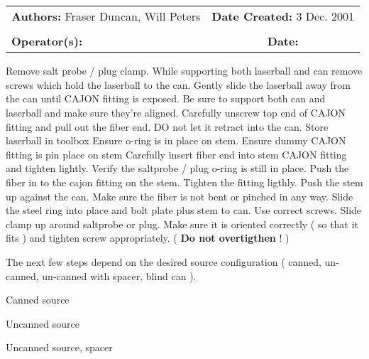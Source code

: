 \documentclass{article}
\begin{document}
 \\   
 \\
\vspace{7mm}
\begin{tabular}{lc}                                                
\textbf{Authors:}  Fraser Duncan, Will Peters    &    \textbf{Date Created:}  3 Dec. 2001   \\ 
                              &                                \\ 
\textbf{Operator(s):}       &           \textbf{Date:} \\
\end{tabular}

   \begin{enumerate}
      
\checkitem Remove salt probe / plug clamp. 
\checkitem While supporting both laserball and can remove screws which hold the laserball to the can.
\checkitem Gently slide the laserball away from the can until CAJON fitting is exposed. Be sure to support both
can and laserball and make sure they're aligned. 
\checkitem Carefully unscrew top end of CAJON fitting and pull out the fiber end. DO not let it retract into the can.
\checkitem Store laserball in toolbox
\checkitem Ensure o-ring is in place on stem.
\checkitem Ensure dummy CAJON fitting is pin place on stem
\checkitem Carefully insert fiber end into stem CAJON fitting and tighten lightly.
\checkitem Verify the saltprobe / plug o-ring is still in place.
\checkitem Push the fiber in to the cajon fitting on the stem. Tighten the fitting ligthly.
\checkitem Push the stem up against the can. Make sure the fiber is not bent or pinched
in any way.
\checkitem Slide the steel ring into place and bolt plate plus stem to can. Use correct screws.
\checkitem Slide clamp up around saltprobe or plug. Make sure it is oriented correctly ( so that
 it fits ) and
tighten screw appropriately. ( {\bf Do not overtigthen  } ! )

  The next few steps depend on the desired source configuration ( canned, un-canned, 
un-canned with spacer, blind can ).


\checkitem Canned source
\begin{enumerate}


\end{enumerate}

\checkitem Uncanned source
\begin{enumerate}


\end{enumerate}

\checkitem Uncanned source, spacer
\begin{enumerate}


\end{enumerate}


   \end{enumerate}
\end{document}
